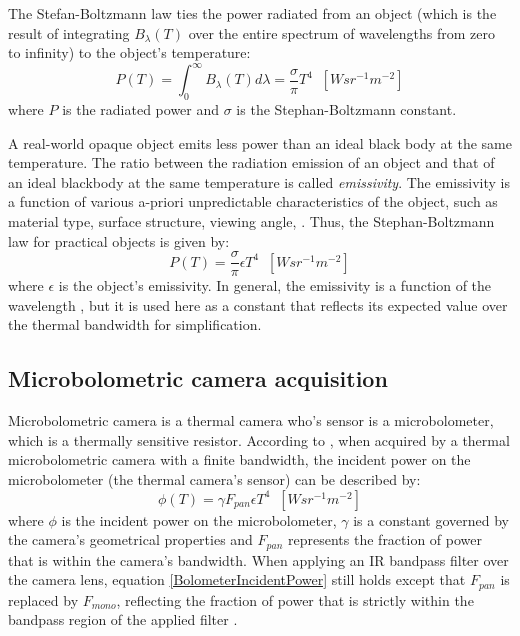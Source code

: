 The Stefan-Boltzmann law \cite{surhone2010stefan} ties the power radiated from an object (which is the result of integrating $B_{\lambda}(T)$ over the entire spectrum of wavelengths from zero to infinity) to the object's temperature:
\begin{equation} \label{eq:stephan-boltzmann-ideal}
    P(T) = \int_0^\infty B_{\lambda}(T) d\lambda = \frac{\sigma}{\pi} T^4 \; \;\left[W sr^{-1} m^{-2}\right]
\end{equation}
where $P$ is the radiated power and $\sigma$ is the Stephan-Boltzmann constant. 

A real-world opaque object emits less power than an ideal black body at the same temperature. 
The ratio between the radiation emission of an object and that of an ideal blackbody at the same temperature is called \emph{emissivity}.
The emissivity is a function of various a-priori unpredictable characteristics of the object, such as material type, surface structure, viewing angle, \etc.
Thus, the Stephan-Boltzmann law for practical objects is given by:
\begin{equation} \label{stephan-boltzmann-practical}
  P(T) =  \frac{\sigma}{\pi} \epsilon T^4 \; \; \left[W sr^{-1} m^{-2}\right]
\end{equation} 
where $\epsilon$ is the object's emissivity.
In general, the emissivity is a function of the wavelength \cite{kerekes2008spectral}, but it is used here as a constant that reflects its expected value over the thermal bandwidth for simplification.

\subsection{Microbolometric camera acquisition}
Microbolometric camera is a thermal camera who's sensor is a microbolometer, which is a thermally sensitive resistor.
According to \cite{FundamentalsOfInfraredThermalImaging}, when acquired by a thermal microbolometric camera with a finite bandwidth, the incident power on the microbolometer (the thermal camera's sensor) can be described by:
\begin{equation} \label{BolometerIncidentPower}
  \phi(T) = \gamma F_\mathit{pan} \epsilon T^4 \; \; \left[W sr^{-1} m^{-2}\right]
\end{equation}
where $\phi$ is the incident power on the microbolometer, $\gamma$ is a constant governed by the camera's geometrical properties and $F_\mathit{pan}$ represents the fraction of power that is within the camera's bandwidth.
When applying an IR bandpass filter over the camera lens, equation \ref{BolometerIncidentPower} still holds except that $F_\mathit{pan}$ is replaced by $F_\mathit{mono}$, reflecting the fraction of power that is strictly within the bandpass region of the applied filter \cite{FundamentalsOfInfraredThermalImaging}.

